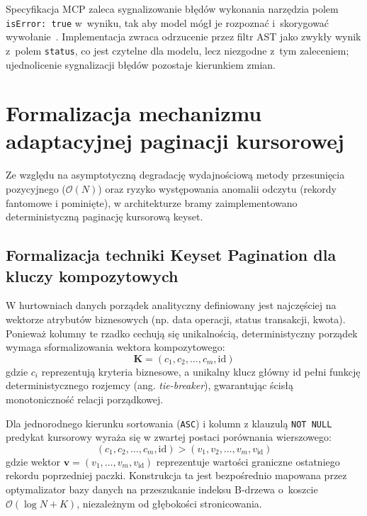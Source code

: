 Specyfikacja MCP zaleca sygnalizowanie błędów wykonania narzędzia polem \texttt{isError: true} w~wyniku, tak aby model mógł je rozpoznać i~skorygować wywołanie~\cite{mcp_spec_20250618}. Implementacja zwraca odrzucenie przez filtr AST jako zwykły wynik z~polem \texttt{status}, co jest czytelne dla modelu, lecz niezgodne z~tym zaleceniem; ujednolicenie sygnalizacji błędów pozostaje kierunkiem zmian.


\section{Formalizacja mechanizmu adaptacyjnej paginacji kursorowej}
\label{sec:projekt_smart_pagination}

Ze względu na asymptotyczną degradację wydajnościową metody przesunięcia pozycyjnego ($\mathcal{O}(N)$) oraz ryzyko występowania anomalii odczytu (rekordy fantomowe i pominięte), w architekturze bramy zaimplementowano deterministyczną paginację kursorową keyset.

\subsection{Formalizacja techniki Keyset Pagination dla kluczy kompozytowych}
\label{subsec:projekt_keyset_formalizacja}

W hurtowniach danych porządek analityczny definiowany jest najczęściej na wektorze atrybutów biznesowych (np. data operacji, status transakcji, kwota). Ponieważ kolumny te rzadko cechują się unikalnością, deterministyczny porządek wymaga sformalizowania wektora kompozytowego:
\begin{equation}
\mathbf{K} = (c_1, c_2, \dots, c_m, \text{id})
\label{eq:keyset_vector}
\end{equation}
gdzie $c_i$ reprezentują kryteria biznesowe, a unikalny klucz główny $\text{id}$ pełni funkcję deterministycznego rozjemcy (ang. \emph{tie-breaker}), gwarantując ścisłą monotoniczność relacji porządkowej.

Dla jednorodnego kierunku sortowania (\texttt{ASC}) i kolumn z klauzulą \texttt{NOT NULL} predykat kursorowy wyraża się w zwartej postaci porównania wierszowego:
\begin{equation}
(c_1, c_2, \dots, c_m, \text{id}) > (v_1, v_2, \dots, v_m, v_{\text{id}})
\label{eq:keyset_row_value}
\end{equation}
gdzie wektor $\mathbf{v} = (v_1, \dots, v_m, v_{\text{id}})$ reprezentuje wartości graniczne ostatniego rekordu poprzedniej paczki. Konstrukcja ta jest bezpośrednio mapowana przez optymalizator bazy danych na przeszukanie indeksu B-drzewa o~koszcie $\mathcal{O}(\log N + K)$, niezależnym od głębokości stronicowania.

